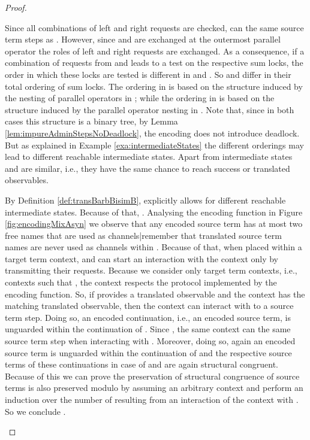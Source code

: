 \documentclass[]{llncs}
\begin{document}
\begin{proof}
\begin{description}
\begin{description}
				Since all combinations of left and right requests are checked,  can \simulate the same source term steps as . However, since  and  are exchanged at the outermost parallel operator the roles of left and right requests are exchanged. As a consequence, if a combination of requests from  and  leads to a test on the respective sum locks, the order in which these locks are tested is different in  and . So  and  differ in their total ordering of sum locks. The ordering in  is based on the structure induced by the nesting of parallel operators in ; while the ordering in  is based on the structure induced by the parallel operator nesting in . Note that, since in both cases this structure is a binary tree, by Lemma \ref{lem:impureAdminStepsNoDeadlock}, the encoding does not introduce deadlock. But as explained in Example \ref{exa:intermediateStates} the different orderings may lead to different reachable intermediate states. Apart from intermediate states  and  are similar, i.e., they have the same chance to reach success or translated observables.
				
				By Definition \ref{def:transBarbBisimB},  explicitly allows for different reachable intermediate states. Because of that, . Analysing the encoding function in Figure \ref{fig:encodingMixAsyn} we observe that any encoded source term has at most two free names that are used as channels|remember that translated source term names are never used as channels within . Because of that, when placed within a target term context,  and  can start an interaction with the context only by transmitting their requests. Because we consider only target term contexts, i.e., contexts  such that , the context respects the protocol implemented by the encoding function. So, if  provides a translated observable and the context has the matching translated observable, then the context can interact with  to \simulate a source term step. Doing so, an encoded continuation, i.e., an encoded source term, is unguarded within the continuation of . Since , the same context can \simulate the same source term step when interacting with . Moreover, doing so, again an encoded source term is unguarded within the continuation of  and the respective source terms of these continuations in case of  and  are again structural congruent. Because of this we can prove the preservation of structural congruence of source terms is also preserved modulo  by assuming an arbitrary context and perform an induction over the number of \simulations resulting from an interaction of the context with . So we conclude .
				

\end{description}
\end{description}
\end{proof}
\end{document}
